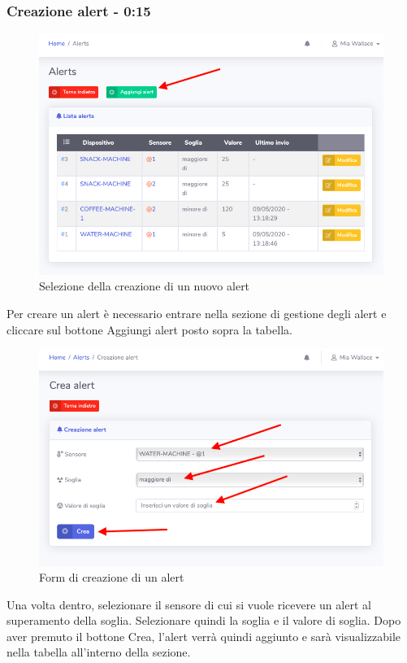	\subsubsection{Creazione alert - 0:15}
	\begin{figure}[H]
		\centering
		\includegraphics[scale=0.600]{res/images/mod/selCreazAlert.png}
		\caption{Selezione della creazione di un nuovo alert}
	\end{figure}
		Per creare un alert è necessario entrare nella sezione di gestione degli alert e cliccare sul bottone Aggiungi alert posto sopra la tabella.
		\begin{figure}[H]
		\centering
		\includegraphics[scale=0.600]{res/images/mod/creazAlert.png}
		\caption{Form di creazione di un alert}
	\end{figure}
	Una volta dentro, selezionare il sensore di cui si vuole ricevere un alert al superamento della soglia. Selezionare quindi la soglia e il valore di soglia.
	Dopo aver premuto il bottone Crea, l'alert verrà quindi aggiunto e sarà visualizzabile nella tabella all'interno della sezione.


